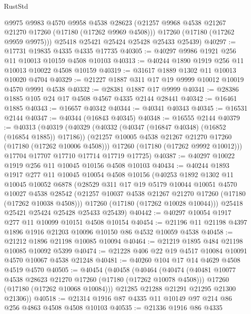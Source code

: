 \begin{lexlean}{RustStd}
\begin{coremodule}
        @9975
        @9983
        @4570
        @9958
        @4538
        @28623
        (@21257 @9968 @4538 @21267 @21270 @17260 (@17180 (@17262 @9969 @4508)))
        @17260
        (@17180 (@17262 @9959 @9975)))
      @25418
      @25421
      @25424
      @25428
      @25433
      @25439)
@40297 := @17731 @19835 @4335 @4335 @17735
@40305 := @40297 @9986 @1921 @256 @11 @10013 @10159 @4508 @10103
@40313 := @40244 @1890 @1919 @256 @11 @10013 @10022 @4508 @10159
@40319 := @31617 @1889 @1302 @11 @10013 @10020 @4704
@40329 := @21227 @1887 @311 @17 @19 @9999 @10012 @10019 @4570 @9991 @4538
@40332 := @28381 @1887 @17 @9999
@40341 := @28386 @1885 @105 @24 @17 @4508 @4567 @4335 @2144 @28441
@40342 := @16461 @1885
@40343 := @16657 @40342
@40344 := @40341 @40343
@40345 := @16531 @2144
@40347 := @40344 (@16843 @40345)
@40348 := @16555 @2144
@40379 := @40313
    (@40319
      (@40329
        (@40332 (@40347 (@16847 @40348) (@16852 (@16854 @1885)) @17186))
        (@21257 @10005 @4538 @21267 @21270 @17260 (@17180 (@17262 @10006 @4508)))
        @17260
        (@17180 (@17262 @9992 @10012)))
      @17704
      @17707
      @17710
      @17714
      @17719
      @17725)
@40387 := @40297 @10022 @1919 @256 @11 @10045 @10156 @4508 @10103
@40434 := @40244
    @1893
    @1917
    @277
    @11
    @10045
    @10054
    @4508
    @10156
    (@40253
      @1892
      @1302
      @11
      @10045
      @10052
      @6878
      (@28529
        @311
        @17
        @19
        @5179
        @10044
        @10051
        @4570
        @10027
        @4538
        @28542
        (@21257 @10037 @4538 @21267 @21270 @17260 (@17180 (@17262 @10038 @4508)))
        @17260
        (@17180 (@17262 @10028 @10044)))
      @25418
      @25421
      @25424
      @25428
      @25433
      @25439)
@40442 := @40297 @10054 @1917 @277 @11 @10099 @10151 @4508 @10154
@40454 := @21196 @11 @21198 @4397 @1896 @1916 @21203 @10096 @10150 @86 @4532 @10059 @4538
@40458 := @21212 @1896 @21198 @10085 @10094
@40464 := @21219 @1895 @484 @21198 @10085 @10092 @5399
@40474 := @21228 @406 @22 @19 @4517 @10084 @10091 @4570 @10067 @4538 @21248
@40481 := @40260 @104 @17 @14 @4629 @4508 @4519 @4570
@40505 := @40454
    (@40458
      (@40464
        (@40474
          (@40481 @10077 @4538 @28623 @21270 @17260 (@17180 (@17262 @10078 @4508)))
          @17260
          (@17180 (@17262 @10068 @10084)))
        @21285
        @21288
        @21291
        @21295
        @21300
        @21306))
@40518 := @21314 @1916 @87 @4335 @11 @10149 @97 @214 @86 @256 @4863 @4508 @4508 @10103
@40535 := @21336
    @1916
    @86
    @4335

\end{coremodule}
\end{lexlean}
